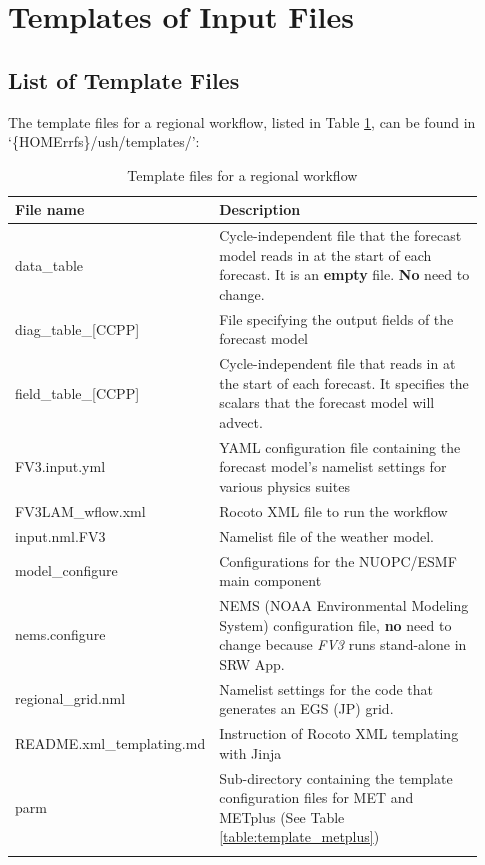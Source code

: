 \documentclass[11pt,fleqn]{report}              %
\begin{document}
\section{Templates of Input Files}
\label{sec:workflow_template}

\subsection{List of Template Files}
\label{subsec:template_list}

The template files for a regional workflow, listed in Table \ref{table:fv3_sar_template_list}, can be found in `\{HOMErrfs\}/ush/templates/':
{
\fontsize{10}{12}\selectfont
\begin{longtable}{p{0.28\linewidth} | p{0.65\linewidth}   }
\hline
\hline
 File name & Description  \\
\hline
 data\_table & Cycle-independent file that the forecast model reads in at the start of each forecast. It is an {\bf empty} file. {\bf No} need to change. \\
 diag\_table\_[CCPP] & File specifying the output fields of the forecast model \\
 field\_table\_[CCPP] & Cycle-independent file that  reads in at the start of each forecast. It specifies the scalars that the forecast model will advect.  \\
 FV3.input.yml & YAML configuration file containing the forecast model's namelist settings for various physics suites \\
 FV3LAM\_wflow.xml & Rocoto XML file to run the workflow \\
 input.nml.FV3 & Namelist file of the weather model. \\
 model\_configure & Configurations for the NUOPC/ESMF main component \\ 
 nems.configure & NEMS (NOAA Environmental Modeling System) configuration file, {\bf no} need to change because {\it FV3} runs stand-alone in SRW App.  \\
 regional\_grid.nml & Namelist settings for the code that generates an EGS (JP) grid. \\
 README.xml\_templating.md & Instruction of Rocoto XML templating with Jinja \\
\hdashline
parm & Sub-directory containing the template configuration files for MET and METplus (See Table \ref{table:template_metplus}) \\
\hline
\caption{Template files for a regional workflow}
\label{table:fv3_sar_template_list}
\end{longtable}
}
\end{document}
